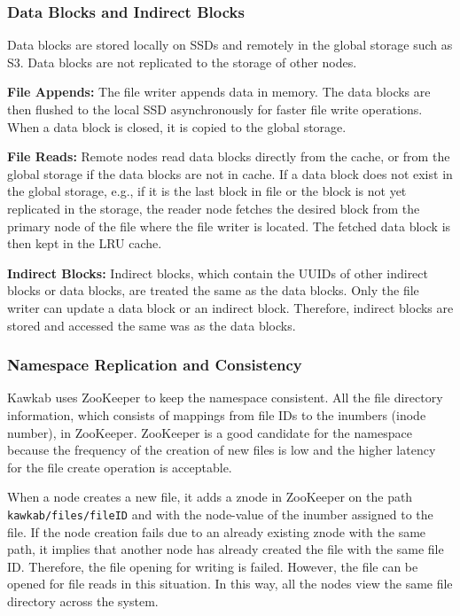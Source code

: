 \documentclass[]{article}
\newcommand{\subtopic}[1]{\vspace{1.5pt} \noindent \textbf{#1}}
\begin{document}
\subsubsection{Data Blocks and Indirect Blocks} Data blocks are stored locally
on SSDs and remotely in the global storage such as S3. Data blocks are
not replicated to the storage of other nodes.

\subtopic{File Appends:} The file writer appends data in memory. The data
blocks are then flushed to the local SSD asynchronously for faster file write
operations. When a data block is closed, it is copied to the global storage.

\subtopic{File Reads:} Remote nodes read data blocks directly from the cache,
or from the global storage if the data blocks are not in cache.  If a
data block does not exist in the global storage, e.g., if it is the last block
in file or the block is not yet replicated in the storage, the reader
node fetches the desired block from the primary node of the file where the file
writer is located. The fetched data block is then kept in the LRU cache.

\subtopic{Indirect Blocks:} Indirect blocks, which contain the UUIDs of other
indirect blocks or data blocks, are treated the same as the data blocks.
Only the file writer can update a data block or an indirect block. Therefore,
indirect blocks are stored and accessed the same was as the data blocks.


\subsubsection{Namespace Replication and Consistency}
Kawkab uses ZooKeeper to keep the namespace consistent. All the file
directory information, which consists of mappings from file IDs to the
inumbers (inode number), in ZooKeeper. ZooKeeper is a good candidate
for the namespace because the frequency of the creation of new files is low
and the higher latency for the file create operation is acceptable.

When a node creates a new file, it adds a znode in ZooKeeper on the path
\texttt{kawkab/files/fileID} and with the node-value of the inumber assigned to
the file. If the node creation fails due to an already existing znode with
the same path, it implies that another node has already created the file with the same
file ID. Therefore, the file opening for writing is failed. However, the file can be
opened for file reads in this situation. In this way, all the nodes view
the same file directory across the system.
\end{document}
